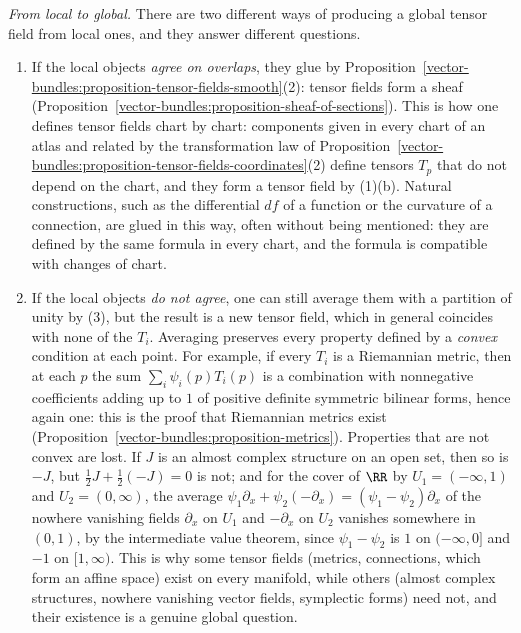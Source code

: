 \begin{remark}\label{vector-bundles:remark-local-to-global}
\emph{From local to global.} There are two different ways of producing a global tensor field from local ones, and they answer different questions.
\begin{enumerate}
\item If the local objects \emph{agree on overlaps}, they glue by Proposition~\ref{vector-bundles:proposition-tensor-fields-smooth}(2): tensor fields form a sheaf
(Proposition~\ref{vector-bundles:proposition-sheaf-of-sections}). This is how one defines tensor fields chart by chart: components given in every chart of an atlas and related by the transformation law of
Proposition~\ref{vector-bundles:proposition-tensor-fields-coordinates}(2) define tensors $T_p$ that do not depend on the chart, and they form a tensor field by (1)(b). Natural constructions, such as the
differential $df$ of a function or the curvature of a connection, are glued in this way, often without being mentioned: they are defined by the same formula in every chart, and the formula is compatible with
changes of chart.
\item If the local objects \emph{do not agree}, one can still average them with a partition of unity by (3), but the result is a new tensor field, which in general coincides with none of the $T_i$. Averaging
preserves every property defined by a \emph{convex} condition at each point. For example, if every $T_i$ is a Riemannian metric, then at each $p$ the sum $\sum_i\psi_i(p)T_i(p)$ is a combination with nonnegative
coefficients adding up to $1$ of positive definite symmetric bilinear forms, hence again one: this is the proof that Riemannian metrics exist
(Proposition~\ref{vector-bundles:proposition-metrics}). Properties that are not convex are lost. If $J$ is an almost complex structure on an open set, then so is $-J$, but $\frac12J + \frac12(-J) = 0$ is not; and for the
cover of $\RR$ by $U_1 = (-\infty, 1)$ and $U_2 = (0, \infty)$, the average $\psi_1\partial_x + \psi_2(-\partial_x) = (\psi_1 - \psi_2)\partial_x$ of the nowhere vanishing fields $\partial_x$ on $U_1$ and $-\partial_x$ on $U_2$
vanishes somewhere in $(0, 1)$, by the intermediate value theorem, since $\psi_1 - \psi_2$ is $1$ on $(-\infty, 0]$ and $-1$ on $[1, \infty)$. This is why some tensor fields
(metrics, connections, which form an affine space) exist on every manifold, while others (almost complex structures, nowhere vanishing vector fields, symplectic forms) need not, and their existence is a
genuine global question.
\end{enumerate}
\end{remark}


